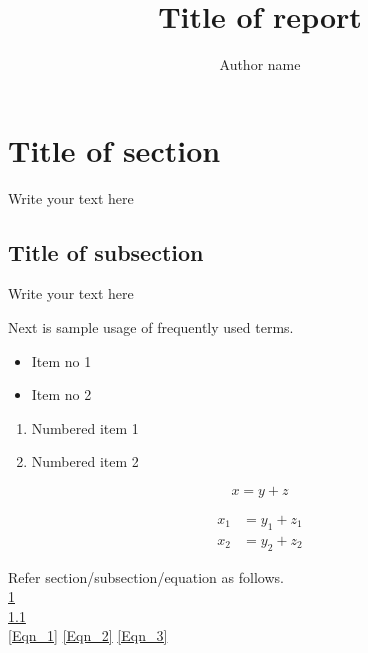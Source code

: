 \documentclass[a4paper,12pt]{article}
\title{Title of report}
\author{Author name}
\date{}
\begin{document}
\maketitle


\section{Title of section}
\label{Section_section_name_1}

Write your text here

\subsection{Title of subsection}
\label{subSection_section_name_2}

Write your text here

Next is sample usage of frequently used terms.

\begin{itemize}
% 
\item Item no 1
\item Item no 2
%  
\end{itemize}


\begin{enumerate}
% 
\item Numbered item 1
\item Numbered item 2
% 
\end{enumerate}


\begin{equation}
%  
x = y + z
\label{Eqn_1}
% 
\end{equation}


\begin{align}
%  
x_1 &= y_1 + z_1 \label{Eqn_2} \\
% 
x_2 &= y_2 + z_2
% 
\label{Eqn_3}
% 
\end{align}
 

 
Refer section/subsection/equation as follows.\\
\cref{Section_section_name_1} \\
\cref{subSection_section_name_2} \\
\cref{Eqn_1} \cref{Eqn_2} \cref{Eqn_3}


\cite{Lin_Costello_Book, Maxell_Urbanke_2008, Yige_DG_ISIT_2006}
% 






\end{document}
